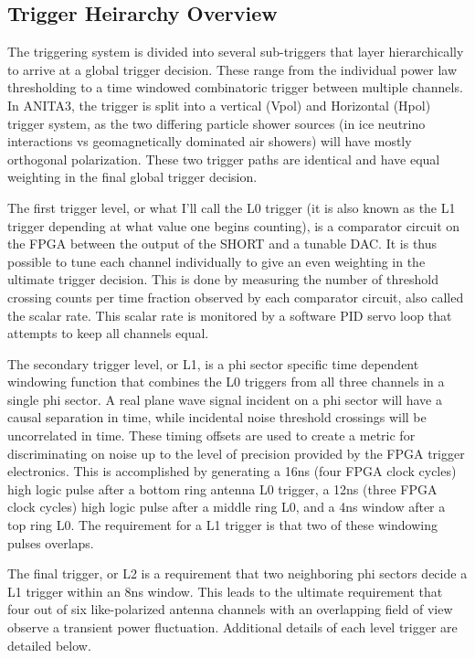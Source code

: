 	
	\subsection{Trigger Heirarchy Overview}
		The triggering system is divided into several sub-triggers that layer hierarchically to arrive at a global trigger decision.   These range from the individual power law thresholding to a time windowed combinatoric trigger between multiple channels.  In ANITA3, the trigger is split into a vertical (Vpol) and Horizontal (Hpol) trigger system, as the two differing particle shower sources (in ice neutrino interactions vs geomagnetically dominated air showers) will have mostly orthogonal polarization.  These two trigger paths are identical and have equal weighting in the final global trigger decision.  
		
		The first trigger level, or what I'll call the L0 trigger (it is also known as the L1 trigger depending at what value one begins counting), is a comparator circuit on the FPGA between the output of the SHORT and a tunable DAC. It is thus possible to tune each channel individually to give an even weighting in the ultimate trigger decision.  This is done by measuring the number of threshold crossing counts per time fraction observed by each comparator circuit, also called the scalar rate.  This scalar rate is monitored by a software PID servo loop that attempts to keep all channels equal.
		
		The secondary trigger level, or L1, is a phi sector specific time dependent windowing function that combines the L0 triggers from all three channels in a single phi sector.  A real plane wave signal incident on a phi sector will have a causal separation in time, while incidental noise threshold crossings will be uncorrelated in time.  These timing offsets are used to create a metric for discriminating on noise up to the level of precision provided by the FPGA trigger electronics.  This is accomplished by generating a 16ns (four FPGA clock cycles) high logic pulse after a bottom ring antenna L0 trigger, a 12ns (three FPGA clock cycles) high logic pulse after a middle ring L0, and a 4ns window after a top ring L0.  The requirement for a L1 trigger is that two of these windowing pulses overlaps.
		
		The final trigger, or L2 is a requirement that two neighboring phi sectors decide a L1 trigger within an 8ns window.  This leads to the ultimate requirement that four out of six like-polarized antenna channels with an overlapping field of view observe a transient power fluctuation.  Additional details of each level trigger are detailed below.
		

